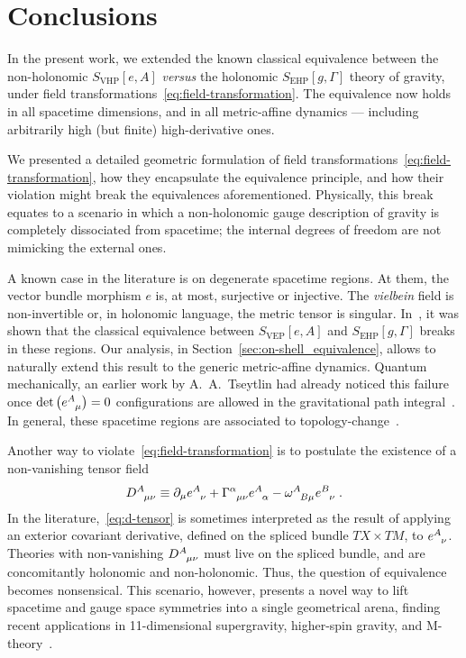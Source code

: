 \documentclass[../../main.tex]{subfiles}
\begin{document}
\section{Conclusions}\label{sec:conclusions}

In the present work, we extended the known classical equivalence between the non-holonomic $S_{\text{VHP}}\left[e,A\right]$ \textit{versus} the holonomic $S_{\text{EHP}}\left[g,\Gamma \right]$ theory of gravity, under field transformations~\eqref{eq:field-transformation}. The equivalence now holds in all spacetime dimensions, and in all metric-affine dynamics --- including arbitrarily high (but finite) high-derivative ones.

We presented a detailed geometric formulation of field transformations~\eqref{eq:field-transformation}, how they encapsulate the equivalence principle, and how their violation might break the equivalences aforementioned. Physically, this break equates to a scenario in which a non-holonomic gauge description of gravity is completely dissociated from spacetime; the internal degrees of freedom are not mimicking the external ones.

A known case in the literature is on degenerate spacetime regions. At them, the vector bundle morphism $e$ is, at most, surjective or injective. The \textit{vielbein} field is non-invertible or, in holonomic language, the metric tensor is singular. In~\cite{kaul2016a,kaul2016b,kaul2019}, it was shown that the classical equivalence between $S_{\text{VEP}}\left[e,A\right]$ and $S_{\text{EHP}}\left[g,\Gamma\right]$ breaks in these regions. Our analysis, in Section~\ref{sec:on-shell_equivalence}, allows to naturally extend this result to the generic metric-affine dynamics. Quantum mechanically, an earlier work by A.~A.~Tseytlin had already noticed this failure once $\det\left(\tensor{e}{^A_\mu}\right)=0$ configurations are allowed in the gravitational path integral~\cite{tseytlin1982}. In general, these spacetime regions are associated to topology-change~\cite{geroch1967,tipler1977,horowitz1991,borde1994,borde1999,heveling2022}.

Another way to violate~\eqref{eq:field-transformation} is to postulate the existence of a non-vanishing tensor field
\begin{equation}
  \label{eq:d-tensor}
  \tensor{D}{^A_{\mu\nu}} \equiv \partial_\mu \tensor{e}{^A_\nu} + \tensor{\Gamma}{^\alpha_{\mu\nu}}\tensor{e}{^A_\alpha}-\tensor{\omega}{^A_{B\mu}}\tensor{e}{^B_\nu}\;.
\end{equation}
In the literature,~\eqref{eq:d-tensor} is sometimes interpreted as the result of applying an exterior covariant derivative, defined on the spliced bundle $TX\times TM$, to $\tensor{e}{^A_\nu}$. Theories with non-vanishing $\tensor{D}{^A_{\mu\nu}}$ must live on the spliced bundle, and are concomitantly holonomic and non-holonomic. Thus, the question of equivalence becomes nonsensical. This scenario, however, presents a novel way to lift spacetime and gauge space symmetries into a single geometrical arena, finding recent applications in 11-dimensional supergravity, higher-spin gravity, and M-theory~\cite{hull2007,engquist2008,nicolai2014a,nicolai2014b}.
\end{document}
